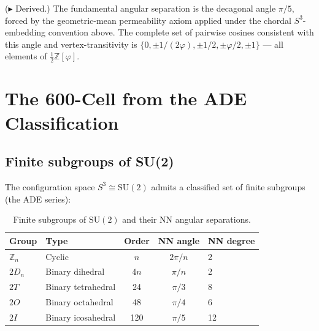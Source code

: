\documentclass[12pt]{article}
\newcommand{\phig}{\varphi}
\begin{document}
($\blacktriangleright$ Derived.) The fundamental angular separation is the
decagonal angle $\pi/5$, forced by the geometric-mean permeability axiom applied under the chordal $S^3$-embedding convention above. The
complete set of pairwise cosines consistent with this angle and
vertex-transitivity is
$\{0, \pm 1/(2\phig), \pm 1/2, \pm \phig/2, \pm 1\}$ --- all elements
of $\tfrac{1}{2}\mathbb{Z}[\phig]$.

\section{The 600-Cell from the ADE Classification}\label{sec:600cell}

\subsection{Finite subgroups of SU(2)}

The configuration space $S^3 \cong \mathrm{SU}(2)$ admits a classified
set of finite subgroups (the ADE series):

\begin{table}[ht]
\centering
\caption{Finite subgroups of $\mathrm{SU}(2)$ and their NN angular separations.}
\label{tab:ade}
\begin{tabular}{@{}llccl@{}}
\toprule
Group & Type & Order & NN angle & NN degree \\
\midrule
$\mathbb{Z}_n$ & Cyclic & $n$ & $2\pi/n$ & 2 \\
$2D_n$ & Binary dihedral & $4n$ & $\pi/n$ & 2 \\
$2T$ & Binary tetrahedral & 24 & $\pi/3$ & 8 \\
$2O$ & Binary octahedral & 48 & $\pi/4$ & 6 \\
$2I$ & Binary icosahedral & 120 & $\pi/5$ & 12 \\
\bottomrule
\end{tabular}
\end{table}
\end{document}
